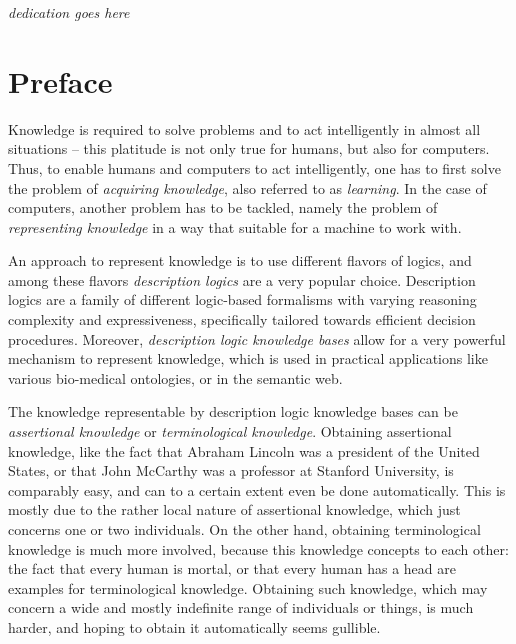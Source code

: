 \vspace*{23ex}

\centerline{\textit{dedication goes here}}

\chapter*{Preface}
\label{cha:preface}

\thispagestyle{empty}

Knowledge is required to solve problems and to act intelligently in almost all situations
-- this platitude is not only true for humans, but also for computers.  Thus, to enable
humans and computers to act intelligently, one has to first solve the problem of
\emph{acquiring knowledge}, also referred to as \emph{learning}.  In the case of
computers, another problem has to be tackled, namely the problem of \emph{representing
  knowledge} in a way that suitable for a machine to work with.

An approach to represent knowledge is to use different flavors of logics, and among these
flavors \emph{description logics} are a very popular choice.  Description logics are a
family of different logic-based formalisms with varying reasoning complexity and
expressiveness, specifically tailored towards efficient decision procedures.  Moreover,
\emph{description logic knowledge bases} allow for a very powerful mechanism to represent
knowledge, which is used in practical applications like various bio-medical ontologies, or
in the semantic web.

The knowledge representable by description logic knowledge bases can be \emph{assertional
  knowledge} or \emph{terminological knowledge}.  Obtaining assertional knowledge, like
the fact that Abraham Lincoln was a president of the United States, or that John McCarthy
was a professor at Stanford University, is comparably easy, and can to a certain extent
even be done automatically.  This is mostly due to the rather local nature of assertional
knowledge, which just concerns one or two individuals.  On the other hand, obtaining
terminological knowledge is much more involved, because this knowledge concepts to each
other: the fact that every human is mortal, or that every human has a head are examples
for terminological knowledge.  Obtaining such knowledge, which may concern a wide and
mostly indefinite range of individuals or things, is much harder, and hoping to obtain it
automatically seems gullible.

